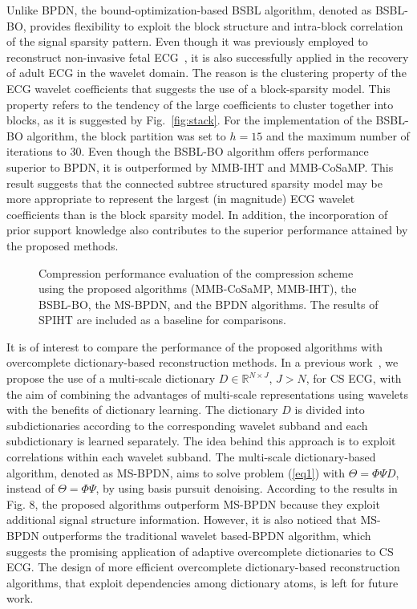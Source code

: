 \documentclass[journal]{IEEEtran}
\begin{document}
Unlike BPDN, the bound-optimization-based BSBL algorithm, denoted as BSBL-BO, provides flexibility to exploit the block structure and  intra-block correlation of the signal sparsity pattern. Even though it was previously employed to reconstruct non-invasive fetal ECG~\cite{Zhan13}, it is also successfully applied in the recovery of adult ECG in the wavelet domain. The reason is the clustering property of the ECG wavelet coefficients that suggests the use of a block-sparsity model. This property refers to the tendency of the large coefficients to cluster together into blocks, as it is suggested by Fig.~\ref{fig:stack}. For the implementation of the BSBL-BO algorithm, the block partition was set to $h=15$ and the maximum number of iterations to 30. Even though the BSBL-BO algorithm offers performance superior to BPDN, it is outperformed by MMB-IHT and MMB-CoSaMP. This result suggests that the connected subtree structured sparsity model may be more appropriate to represent the largest (in magnitude) ECG wavelet coefficients than is the block sparsity model. In addition, the incorporation of prior support knowledge also contributes to the superior performance attained by the proposed methods.

\begin{figure}[t]
\caption{Compression performance evaluation of the compression scheme using the proposed algorithms (MMB-CoSaMP, MMB-IHT), the BSBL-BO, the MS-BPDN, and the BPDN algorithms. The results of SPIHT are included as a baseline for comparisons.} \label{fig:203}
\end{figure}

It is of interest to compare the performance of the proposed algorithms with overcomplete dictionary-based reconstruction methods. In a previous work~\cite{Pola13}, we propose the use of a multi-scale dictionary $D\in\mathbb{R}^{N\times J}$, $J>N$, for CS ECG, with the aim of combining the advantages of multi-scale representations using wavelets with the benefits of dictionary learning. The dictionary $D$ is divided into subdictionaries according to the corresponding wavelet subband and each subdictionary is learned separately. The idea behind this approach is to exploit correlations within each wavelet subband. The multi-scale dictionary-based algorithm, denoted as MS-BPDN, aims to solve problem (\ref{eq1}) with $\Theta=\Phi\Psi D$, instead of $\Theta=\Phi\Psi$, by using basis pursuit denoising. According to the results in Fig. 8, the proposed algorithms outperform MS-BPDN because they exploit additional signal structure information. However, it is also noticed that MS-BPDN outperforms the traditional wavelet based-BPDN algorithm, which suggests the promising application of adaptive overcomplete dictionaries to CS ECG. The design of more efficient overcomplete dictionary-based reconstruction algorithms, that exploit dependencies among dictionary atoms, is left for future work.
\end{document}
